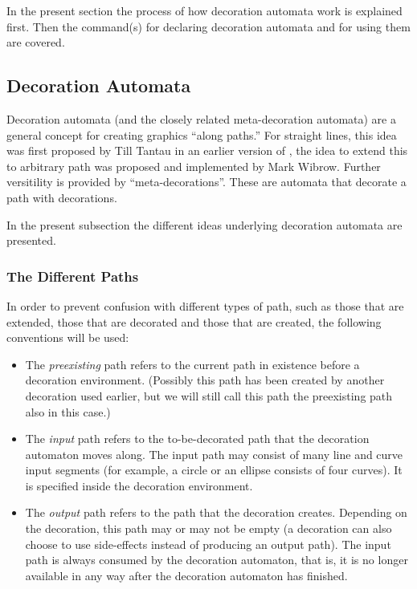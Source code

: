 In the present section the process of how decoration automata work is
explained first. Then the command(s) for declaring decoration automata
and for using them are covered.



\subsection{Decoration Automata}

Decoration automata (and the closely related meta-decoration automata)
are a general concept for creating graphics ``along paths.'' For
straight lines, this idea was first proposed by Till Tantau in an
earlier version of \pgfname, the idea to extend this to arbitrary path
was proposed and implemented by Mark Wibrow. Further versitility is
provided by ``meta-decorations''. These are automata that decorate a
path with decorations. 

In the present subsection the different ideas underlying decoration
automata are presented.



\subsubsection{The Different Paths}

In order to prevent confusion with different types of path, such
as those that are extended, those that are decorated and those that 
are created, the following conventions will be used:

\begin{itemize}
\item 
  The \emph{preexisting} path refers to the current path in existence 
  before a decoration environment. (Possibly this path has been
  created by another decoration used earlier, but we will still call
  this path the preexisting path also in this case.)
\item
  The \emph{input} path refers to the to-be-decorated path that the
  decoration automaton moves along. The input path may consist of many
  line and curve input segments (for example, a circle or an ellipse
  consists of four curves). It is specified inside the decoration
  environment. 
\item
  The \emph{output} path refers to the path that the decoration 
  creates. Depending on the decoration, this path may or may not be
  empty (a decoration can also choose to use side-effects instead of
  producing an output path). The input path is always consumed by the
  decoration automaton, that is, it is no longer available in any way
  after the decoration automaton has finished. 
\end{itemize}

